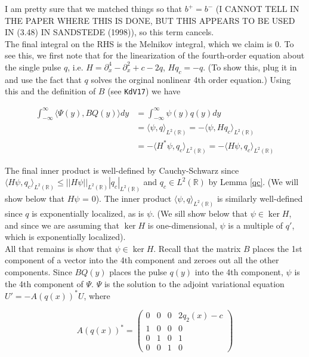 \documentclass[12pt]{article}
\def\R{{\mathbb R}}
\begin{document}
I am pretty sure that we matched things so that $b^+ = b^-$ (I CANNOT TELL IN THE PAPER WHERE THIS IS DONE, BUT THIS APPEARS TO BE USED IN (3.48) IN SANDSTEDE (1998)), so this term cancels.\\

The final integral on the RHS is the Melnikov integral, which we claim is 0. To see this, we first note that for the linearization of the fourth-order equation about the single pulse $q$, i.e. $H = \partial_x^4 - \partial_x^2 + c - 2q$, $Hq_c = -q$. (To show this, plug it in and use the fact that $q$ solves the orginal nonlinear 4th order equation.) Using this and the definition of $B$ (see \texttt{KdV17}) we have

\begin{align*}
 \int_{-\infty}^\infty \langle \Psi(y), BQ(y) \rangle dy &=  \int_{-\infty}^\infty \psi(y) q(y) dy \\
&= \langle \psi, q \rangle_{L^2(\R)} = -\langle \psi, H q_c \rangle_{L^2(\R)} \\
&= -\langle H^* \psi, q_c\rangle_{L^2(\R)} = -\langle H \psi, q_c \rangle_{L^2(\R)}
\end{align*}

The final inner product is well-defined by Cauchy-Schwarz since $\langle H \psi, q_c \rangle_{L^2(\R)} \leq ||H \psi||_{L^2(\R)} |q_c|_{L^2(\R)}$ and $q_c \in L^2(\R)$ by Lemma \ref{qc}. (We will show below that $H \psi$ = 0). The inner product $\langle \psi, q \rangle_{L^2(\R)}$ is similarly well-defined since $q$ is exponentially localized, as is $\psi$. (We sill show below that $\psi \in \ker H$, and since we are assuming that $\ker H$ is one-dimensional, $\psi$ is a multiple of $q'$, which is exponentially localized).\\

All that remains is show that $\psi \in \ker H$. Recall that the matrix $B$ places the 1st component of a vector into the 4th component and zeroes out all the other components. Since $BQ(y)$ places the pulse $q(y)$ into the 4th component, $\psi$ is the 4th component of $\Psi$. $\Psi$ is the solution to the adjoint variational equation $U' = -A(q(x))^*U$, where 

\[ 
A(q(x))^* = 
 \begin{pmatrix}0 & 0 & 0 & 2q_2(x) - c \\ 1 & 0 & 0 & 0 \\ 0 & 1 & 0 & 1 \\ 0 & 0 & 1 & 0\end{pmatrix}
\]
\end{document}
